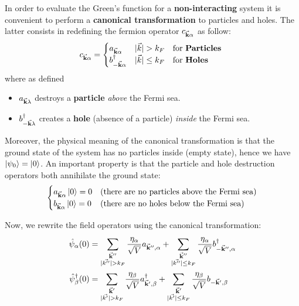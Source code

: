 \documentclass[11pt, a4paper, twoside, openright]{article}
\begin{document}
In order to evaluate the Green’s function for a \textbf{non-interacting} system it is convenient to perform a \textbf{canonical transformation} to particles and holes.
The latter consists in redefining the fermion operator
\( c_{ \va{k}\alpha } \) as follow:
\begin{equation}
c_{\va{k}\alpha }=
  \begin{cases}
   a_{\va{k} \alpha } & | \vec{k} | > k_F \quad \text{for \textbf{Particles} }\\
   b_{-\va{k} \alpha }^\dag & | \vec{k} | \le k_F\quad \text{for \textbf{Holes} }
  \end{cases}
\end{equation}
where as defined
\begin{itemize}
\item \( a_{\va{k}\lambda  } \) destroys a \textbf{particle} \emph{above} the Fermi sea.
\item \(  b_{-\va{k} \lambda }^\dag \) creates a \textbf{hole} (absence of a particle) \emph{inside} the Fermi sea.
\end{itemize}
Moreover, the physical meaning of the canonical transformation is that the ground state of the system has no particles inside (empty state), hence we have \( \ket{\psi _0} = \ket{0}   \). An important property is that the particle and hole destruction operators both annihilate the ground state:
\begin{equation*}
  \begin{cases}
   a_{\va{k}\alpha } \ket{0} = 0 & \text{(there are no particles above the Fermi sea)} \\
   b_{\va{k}\alpha } \ket{0} = 0 & \text{(there are no holes below the Fermi sea)}
  \end{cases}
\end{equation*}


Now, we rewrite the field operators using the canonical transformation:
\begin{subequations}
\begin{align}
  \hat{\psi }_ \alpha (0)  &= \sum_{\substack{\va{k}'' \\ \absvec{k''} > k_F  } }^{}  \frac{\eta _ \alpha }{\sqrt{V} } a_{\va{k}'', \alpha }
  +
  \sum_{\substack{\va{k}'' \\ \absvec{k''} \le k_F  } }^{}  \frac{\eta _ \alpha }{\sqrt{V} } b_{-\va{k}'', \alpha } ^\dag  \\ %
  \hat{\psi }_ \beta ^\dag (0)  &= \sum_{\substack{\va{k}' \\ \absvec{k'} > k_F  } }^{}  \frac{\eta _ \beta }{\sqrt{V} } a_{\va{k}', \beta } ^\dag
  +
  \sum_{\substack{\va{k}' \\ \absvec{k'} \le k_F  } }^{}  \frac{\eta _ \beta }{\sqrt{V} } b_{-\va{k}', \beta }
\end{align}
\end{subequations}
\end{document}
